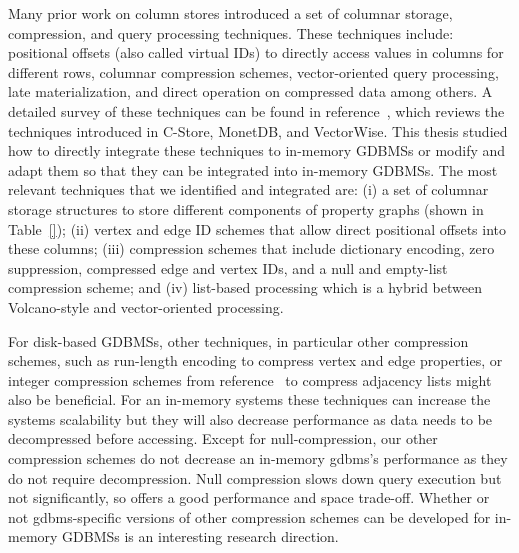 Many prior work on column stores introduced a set of columnar storage, compression, and query processing techniques. These techniques include: positional offsets (also called virtual IDs) to directly access values in columns for different rows, columnar compression schemes, vector-oriented query processing, late materialization, and direct operation on compressed data among others. A detailed survey of these techniques can be found in reference~\cite{design-imp-book}, which reviews the techniques introduced in C-Store, MonetDB, and VectorWise.  This thesis studied how to directly integrate these techniques to in-memory GDBMSs or modify and adapt them so that they can be integrated into in-memory GDBMSs. The most relevant techniques that we identified and integrated are:  (i) a set of columnar storage structures to store different components of property graphs (shown in Table~\ref{}); (ii) vertex and edge ID schemes that allow direct positional offsets into these columns; (iii) compression schemes that include dictionary encoding, zero suppression, compressed edge and vertex IDs, and a null and empty-list compression scheme;  and (iv) list-based processing which is a hybrid between Volcano-style and vector-oriented processing. 

For disk-based GDBMSs, other techniques, in particular other compression schemes, such as run-length encoding to compress vertex and edge properties, or integer compression schemes from reference~\cite{lemire:integer} to compress adjacency lists might also be beneficial. For an in-memory systems these techniques can increase the systems scalability but they will also decrease performance as data needs to be decompressed before accessing. Except for null-compression, our other compression schemes do not decrease an in-memory \gls{gdbms}'s performance as they do not require decompression. Null compression slows down query execution but not significantly, so offers a good performance and space trade-off. Whether or not \gls{gdbms}-specific versions of other compression schemes can be developed for in-memory GDBMSs is an interesting research direction.


